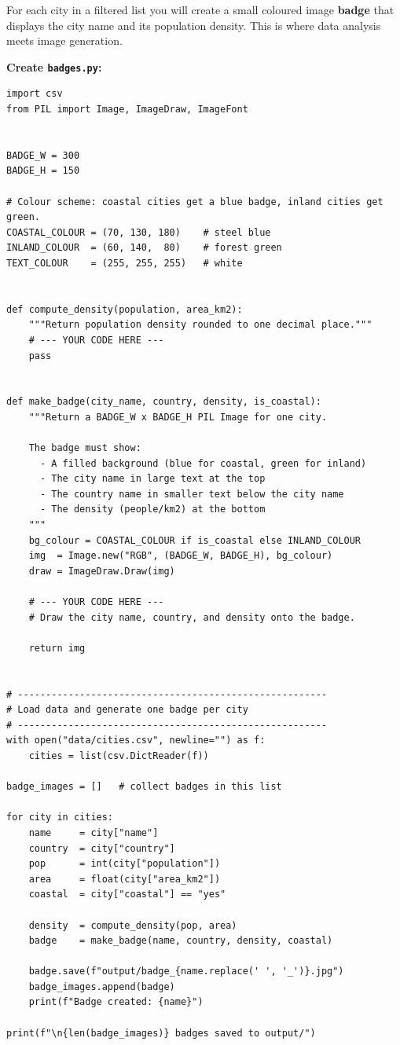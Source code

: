\documentclass{cslab}
\begin{document}

For each city in a filtered list you will create a small coloured image \textbf{badge}
that displays the city name and its population density.  This is where data analysis
meets image generation.

\textbf{Create \texttt{badges.py}:}

\begin{lstlisting}
import csv
from PIL import Image, ImageDraw, ImageFont


BADGE_W = 300
BADGE_H = 150

# Colour scheme: coastal cities get a blue badge, inland cities get green.
COASTAL_COLOUR = (70, 130, 180)    # steel blue
INLAND_COLOUR  = (60, 140,  80)    # forest green
TEXT_COLOUR    = (255, 255, 255)   # white


def compute_density(population, area_km2):
    """Return population density rounded to one decimal place."""
    # --- YOUR CODE HERE ---
    pass


def make_badge(city_name, country, density, is_coastal):
    """Return a BADGE_W x BADGE_H PIL Image for one city.

    The badge must show:
      - A filled background (blue for coastal, green for inland)
      - The city name in large text at the top
      - The country name in smaller text below the city name
      - The density (people/km2) at the bottom
    """
    bg_colour = COASTAL_COLOUR if is_coastal else INLAND_COLOUR
    img  = Image.new("RGB", (BADGE_W, BADGE_H), bg_colour)
    draw = ImageDraw.Draw(img)

    # --- YOUR CODE HERE ---
    # Draw the city name, country, and density onto the badge.

    return img


# -------------------------------------------------------
# Load data and generate one badge per city
# -------------------------------------------------------
with open("data/cities.csv", newline="") as f:
    cities = list(csv.DictReader(f))

badge_images = []   # collect badges in this list

for city in cities:
    name     = city["name"]
    country  = city["country"]
    pop      = int(city["population"])
    area     = float(city["area_km2"])
    coastal  = city["coastal"] == "yes"

    density  = compute_density(pop, area)
    badge    = make_badge(name, country, density, coastal)

    badge.save(f"output/badge_{name.replace(' ', '_')}.jpg")
    badge_images.append(badge)
    print(f"Badge created: {name}")

print(f"\n{len(badge_images)} badges saved to output/")
\end{lstlisting}
\end{document}
